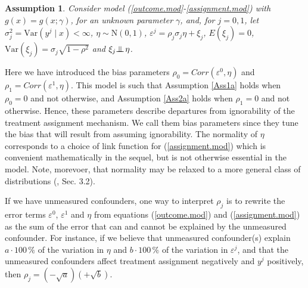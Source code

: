 \documentclass[11pt]{article}
\newtheorem{Ass}{Assumption}
\newcommand{\ci}{\mbox{\protect $\: \perp \hspace{-2.3ex}\perp$ }}
\newcommand{\Var}{{\mbox{Var}}}
\begin{document}
\begin{Ass}
\label{Ass3}
Consider model (\ref{outcome.mod}-\ref{assignment.mod}) with $g(x)= g(x; \gamma)$, for an unknown parameter $\gamma$, and, for $j=0, 1$, let $\sigma_j^2=\mbox{Var}(y^j\mid x)<\infty$, $\eta \sim \mbox{N}(0, 1)$, $\varepsilon^j= \rho_j \sigma_j \eta + \xi_j$, $E(\xi_j)=0$, $\Var(\xi_j)=\sigma_j\sqrt{1-\rho^2}$ and $\xi_j \ci \eta$. 
\end{Ass}
Here we have introduced the bias parameters $\rho_0=Corr(\varepsilon^0,\eta)$ and $\rho_1=Corr(\varepsilon^1,\eta)$. 
This model is such that Assumption \ref{Ass1a} holds when $\rho_0=0$ and not otherwise, and Assumption \ref{Ass2a} holds when $\rho_1=0$ and not otherwise. Hence, these parameters describe departures from ignorability of the treatment assignment mechanism. We call them bias parameters since they tune the bias that will result from assuming ignorability. 
The normality of $\eta$ corresponds to a choice of link function for (\ref{assignment.mod}) which is convenient mathematically in the sequel, but is not otherwise essential in the model. Note, morevoer, that normality may be relaxed to a more general class of distributions (\citealp{Genback:2015}, Sec. 3.2).

If we have unmeasured confounders, one way to interpret $\rho_j$ is to rewrite the error terms $\varepsilon^0$, $\varepsilon^1$ and $\eta$ from equations (\ref{outcome.mod}) and (\ref{assignment.mod}) as the sum of the error that can and cannot be explained by the unmeasured confounder. For instance, if we believe that unmeasured confounder(s) explain $a\cdot100\, \%$ of the variation in $\eta$ and $b\cdot100\, \%$ of the variation in $\varepsilon^j$, and that the unmeasured confounders affect treatment assignment negatively and $y^j$ positively, then $\rho_j=(-\sqrt{a})(+\sqrt{b})$. 
\end{document}
